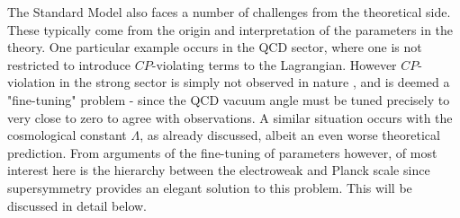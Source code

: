 The Standard Model also faces a number of challenges from the theoretical side. These typically come from the origin and interpretation of the parameters in the theory. One particular example occurs in the QCD sector, where one is not restricted to introduce $CP$-violating terms to the Lagrangian. However $CP$-violation in the strong sector is simply not observed in nature \cite{RN496}, and is deemed a "fine-tuning" problem - since the QCD vacuum angle must be tuned precisely to very close to zero to agree with observations. A similar situation occurs with the cosmological constant $\Lambda$, as already discussed, albeit an even worse theoretical prediction. From arguments of the fine-tuning of parameters however, of most interest here is the hierarchy between the electroweak and Planck scale since supersymmetry provides an elegant solution to this problem. This will be discussed in detail below.
